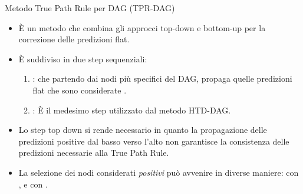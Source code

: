 \documentclass[9pt]{beamer}
\begin{document}
\begin{tframe}{Metodo True Path Rule per DAG (TPR-DAG)}
\begin{itemize}
\item È un metodo che combina gli approcci top-down e bottom-up per la correzione delle predizioni flat. 
\item È suddiviso in due step sequenziali:
\begin{enumerate}
\item {}: che partendo dai nodi più specifici del DAG, propaga quelle predizioni flat che sono considerate .
\item {}: È il medesimo step utilizzato dal metodo HTD-DAG.
\end{enumerate}
\item Lo step top down si rende necessario in quanto la propagazione delle predizioni positive dal basso verso l’alto non garantisce la consistenza delle predizioni necessarie alla True Path Rule. 
\item La selezione dei nodi considerati \emph{positivi} può avvenire in diverse maniere: con ,  e con .
\end{itemize}
\end{tframe}

\end{document}
